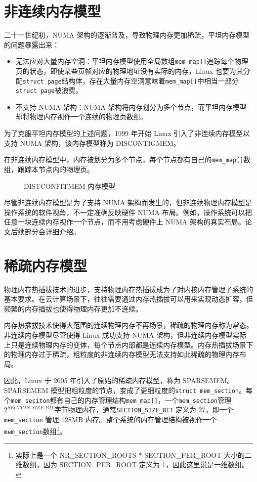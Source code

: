 \documentclass[AutoFakeBold]{LZUThesis}
\begin{document}
\begin{sloppypar}
\section{非连续内存模型}

二十一世纪初，NUMA
架构的逐渐普及，导致物理内存更加稀疏，平坦内存模型的问题暴露出来：

\begin{itemize}
\item
  无法应对大量内存空洞：平坦内存模型使用全局数组\texttt{mem\_map{[}{]}}追踪每个物理页的状态，即使某些页帧对应的物理地址没有实际的内存，Linux
  也要为其分配\texttt{struct\ page}结构体，存在大量内存空洞意味着\texttt{mem\_map{[}{]}}中相当一部分\texttt{struct\ page}被浪费。
\item
  不支持 NUMA 架构：NUMA
  架构将内存划分为多个节点，而平坦内存模型却将物理内存视作一个连续的物理页数组。
\end{itemize}

为了克服平坦内存模型的上述问题，1999 年开始 Linux
引入了非连续内存模型以支持 NUMA 架构，该内存模型称为 DISCONTIGMEM。

在非连续内存模型中，内存被划分为多个节点，每个节点都有自己的\texttt{mem\_map{[}{]}}数组，跟踪本节点内的物理页。

\begin{figure}
\centering

\caption{DISTCONFITMEM 内存模型}
\end{figure}

尽管非连续内存模型是为了支持 NUMA
架构而发生的，但非连续物理内存模型是操作系统的软件视角，不一定准确反映硬件
NUMA
布局。例如，操作系统可以把任意一块连续内存视作一个节点，而不用考虑硬件上
NUMA 架构的真实布局。论文后续部分会详细介绍。


\section{稀疏内存模型}

物理内存热插拔技术的进步，支持物理内存热插拔成为了对内核内存管理子系统的基本要求。在云计算场景下，往往需要通过内存热插拔可以用来实现动态扩容，但频繁的内存插拔也使得物理内存更加不连续。

内存热插拔技术使得大范围的连续物理内存不再场景，稀疏的物理内存称为常态。非连续内存模型尽管使得
Linux 成功支持 NUMA
架构，但非连续内存模型实际上只是连续物理内存的变体，每个节点内部都是连续内存模型。内存热插拔场景下的物理内存过于稀疏，粗粒度的非连续内存模型无法支持如此稀疏的物理内存布局。

因此，Linux 于 2005 年引入了原始的稀疏内存模型，称为
SPARSEMEM。SPARSEMEM
模型把粗粒度的节点，变成了更细粒度的\texttt{struct\ mem\_section}。每个\texttt{mem\_seciton}都有自己的内存管理结构\texttt{mem\_map{[}{]}}，一个\texttt{mem\_section}管理\(2^{SECTION\_SIZE\_BIT}\)字节物理内存，通常\texttt{SECTION\_SIZE\_BIT}
定义为 27，即一个\texttt{mem\_section} 管理 128MB
内存。整个系统的内存管理结构被视作一个\texttt{mem\_section}数组\footnote{实际上是一个
  NR\_SECTION\_ROOTS * SECTION\_PER\_ROOT 大小的二维数组，因为
  SECTION\_PER\_ROOT 定义为 1，因此这里说是一维数组。}。


\end{sloppypar}
\end{document}
